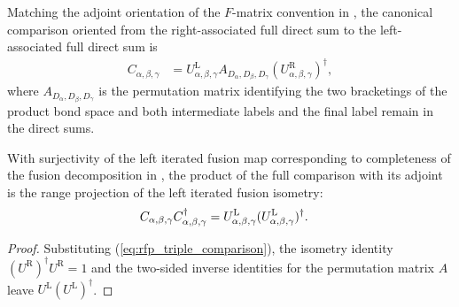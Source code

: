 \begin{definition}%
    \label{def:mpdo_triple_fusion_comparison}
    \leanok
    Matching the adjoint orientation of the $F$-matrix convention in
    \cite[Section~3.4]{Bultinck2017Anyons}, the canonical comparison oriented
    from the right-associated full direct sum to the left-associated full
    direct sum is
    \begin{align}
        C_{\alpha,\beta,\gamma}
         & =U^{\mathrm L}_{\alpha,\beta,\gamma}
        A_{D_\alpha,D_\beta,D_\gamma}
        (U^{\mathrm R}_{\alpha,\beta,\gamma})^\dagger,
        \label{eq:rfp_triple_comparison}
    \end{align}
    where $A_{D_\alpha,D_\beta,D_\gamma}$ is the permutation matrix identifying
    the two bracketings of the product bond space and both intermediate labels
    and the final label remain in the direct sums.
\end{definition}

\begin{lemma}%
    \label{lem:mpdo_triple_fusion_comparison_left_range}
    \leanok
    With surjectivity of the left iterated fusion map corresponding to
    completeness of the fusion decomposition in
    \cite[lines~181--191]{Bultinck2017Anyons}, the product of the full
    comparison with its adjoint is the range projection of the left iterated
    fusion isometry:
    \begin{align}
        C_{\alpha,\beta,\gamma}C_{\alpha,\beta,\gamma}^{\dagger}
         & =U^{\mathrm L}_{\alpha,\beta,\gamma}
        (U^{\mathrm L}_{\alpha,\beta,\gamma})^{\dagger}.
        \notag
    \end{align}
\end{lemma}
\begin{proof}\leanok
    Substituting (\ref{eq:rfp_triple_comparison}), the isometry identity
    $(U^{\mathrm R})^\dagger U^{\mathrm R}=1$ and the two-sided inverse
    identities for the permutation matrix $A$ leave
    $U^{\mathrm L}(U^{\mathrm L})^\dagger$.
\end{proof}

